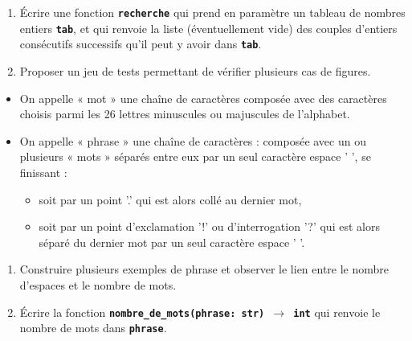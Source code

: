 \documentclass[a4paper,11pt]{article}
\begin{document}
\begin{exo}
    \begin{enumerate}
        \item Écrire une fonction \texttt{\textbf{recherche}} qui prend en paramètre un tableau de nombres entiers
              \texttt{\textbf{tab}}, et qui renvoie la liste (éventuellement vide) des couples d'entiers consécutifs
              successifs qu'il peut y avoir dans \texttt{\textbf{tab}}.
        \item Proposer un jeu de tests permettant de vérifier plusieurs cas de figures.
    \end{enumerate}
\end{exo}
\begin{exo}
    \begin{itemize}
        \item On appelle « mot » une chaîne de caractères composée avec des caractères choisis
              parmi les 26 lettres minuscules ou majuscules de l'alphabet.
        \item On appelle « phrase » une chaîne de caractères :
              composée avec un ou plusieurs « mots » séparés entre eux par un seul
              caractère espace ' ', se finissant :
              \begin{itemize}
                  \item soit par un point '.' qui est alors collé au dernier mot,
                  \item soit par un point d'exclamation '!' ou d'interrogation '?' qui est alors séparé du dernier mot par un seul caractère espace ' '.
              \end{itemize}
    \end{itemize}
    \begin{enumerate}
        \item Construire plusieurs exemples de phrase et observer le lien entre le nombre d'espaces et le nombre de mots.
        \item Écrire la fonction \textbf{\texttt{nombre\_de\_mots(phrase: str) $\rightarrow$ int}} qui renvoie le nombre de mots dans \textbf{\texttt{phrase}}.
    \end{enumerate}
\end{exo}
\end{document}
